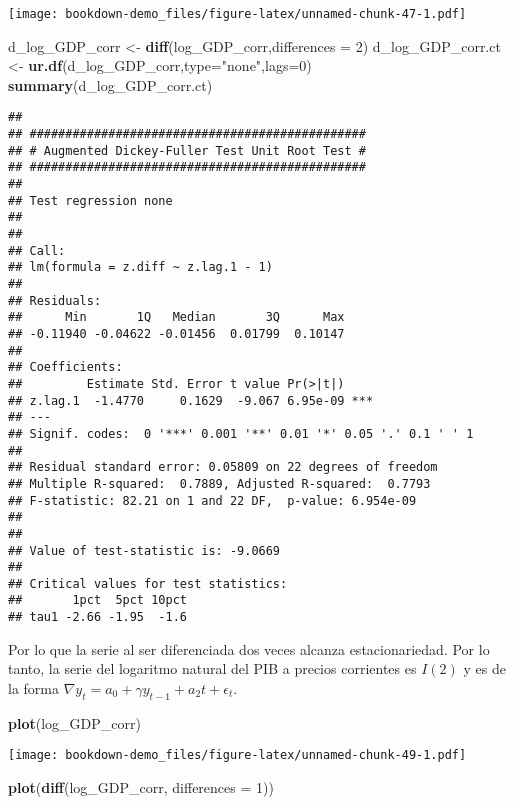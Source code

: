 \documentclass[]{book}
\newenvironment{Shaded}{\begin{snugshade}}{\end{snugshade}}
\newcommand{\KeywordTok}[1]{\textcolor[rgb]{0.13,0.29,0.53}{\textbf{#1}}}
\newcommand{\DataTypeTok}[1]{\textcolor[rgb]{0.13,0.29,0.53}{#1}}
\newcommand{\DecValTok}[1]{\textcolor[rgb]{0.00,0.00,0.81}{#1}}
\newcommand{\StringTok}[1]{\textcolor[rgb]{0.31,0.60,0.02}{#1}}
\newcommand{\NormalTok}[1]{#1}
\theoremstyle{definition}
\theoremstyle{definition}
\theoremstyle{definition}
\theoremstyle{remark}
\begin{document}
\texttt{[image: bookdown-demo\_files/figure-latex/unnamed-chunk-47-1.pdf]}

\begin{Shaded}
\begin{Highlighting}[]
\NormalTok{d_log_GDP_corr <-}\StringTok{ }\KeywordTok{diff}\NormalTok{(log_GDP_corr,}\DataTypeTok{differences =} \DecValTok{2}\NormalTok{)}
\NormalTok{d_log_GDP_corr.ct <-}\StringTok{ }\KeywordTok{ur.df}\NormalTok{(d_log_GDP_corr,}\DataTypeTok{type=}\StringTok{"none"}\NormalTok{,}\DataTypeTok{lags=}\DecValTok{0}\NormalTok{)}
\KeywordTok{summary}\NormalTok{(d_log_GDP_corr.ct)}
\end{Highlighting}
\end{Shaded}

\begin{verbatim}
## 
## ############################################### 
## # Augmented Dickey-Fuller Test Unit Root Test # 
## ############################################### 
## 
## Test regression none 
## 
## 
## Call:
## lm(formula = z.diff ~ z.lag.1 - 1)
## 
## Residuals:
##      Min       1Q   Median       3Q      Max 
## -0.11940 -0.04622 -0.01456  0.01799  0.10147 
## 
## Coefficients:
##         Estimate Std. Error t value Pr(>|t|)    
## z.lag.1  -1.4770     0.1629  -9.067 6.95e-09 ***
## ---
## Signif. codes:  0 '***' 0.001 '**' 0.01 '*' 0.05 '.' 0.1 ' ' 1
## 
## Residual standard error: 0.05809 on 22 degrees of freedom
## Multiple R-squared:  0.7889, Adjusted R-squared:  0.7793 
## F-statistic: 82.21 on 1 and 22 DF,  p-value: 6.954e-09
## 
## 
## Value of test-statistic is: -9.0669 
## 
## Critical values for test statistics: 
##       1pct  5pct 10pct
## tau1 -2.66 -1.95  -1.6
\end{verbatim}

Por lo que la serie al ser diferenciada dos veces alcanza
estacionariedad. Por lo tanto, la serie del logaritmo natural del PIB a
precios corrientes es \(I(2)\) y es de la forma
\(\nabla y_{t} = a_0 + \gamma y_{t-1} + a_2 t + \epsilon_t\).

\begin{Shaded}
\begin{Highlighting}[]
\KeywordTok{plot}\NormalTok{(log_GDP_corr)}
\end{Highlighting}
\end{Shaded}

\texttt{[image: bookdown-demo\_files/figure-latex/unnamed-chunk-49-1.pdf]}

\begin{Shaded}
\begin{Highlighting}[]
\KeywordTok{plot}\NormalTok{(}\KeywordTok{diff}\NormalTok{(log_GDP_corr, }\DataTypeTok{differences =} \DecValTok{1}\NormalTok{))}
\end{Highlighting}
\end{Shaded}
\end{document}
